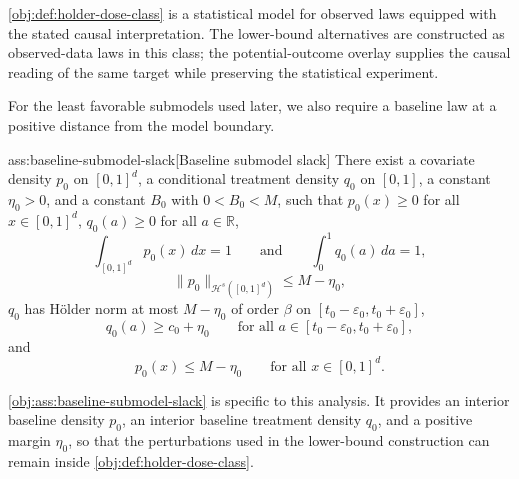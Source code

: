 \cref{obj:def:holder-dose-class} is a statistical model for observed laws equipped with the stated causal interpretation. The lower-bound alternatives are constructed as observed-data laws in this class; the potential-outcome overlay supplies the causal reading of the same target while preserving the statistical experiment.

For the least favorable submodels used later, we also require a baseline law at a positive distance from the model boundary.

\begin{assumptionv}{ass:baseline-submodel-slack}[Baseline submodel slack]
There exist a covariate density \(p_0\) on \([0,1]^d\), a conditional treatment density \(q_0\) on \([0,1]\), a constant \(\eta_0>0\), and a constant \(B_0\) with \(0<B_0<M\), such that \(p_0(x)\ge 0\) for all \(x\in[0,1]^d\), \(q_0(a)\ge 0\) for all \(a\in\mathbb R\),
\[
\int_{[0,1]^d} p_0(x)\,dx=1
\qquad\text{and}\qquad
\int_0^1 q_0(a)\,da=1,
\]
\[
\|p_0\|_{\mathcal H^s([0,1]^d)}\le M-\eta_0,
\]
\(q_0\) has Hölder norm at most \(M-\eta_0\) of order \(\beta\) on \([t_0-\varepsilon_0,t_0+\varepsilon_0]\),
\[
q_0(a)\ge c_0+\eta_0
\qquad\text{for all }a\in[t_0-\varepsilon_0,t_0+\varepsilon_0],
\]
and
\[
p_0(x)\le M-\eta_0
\qquad\text{for all }x\in[0,1]^d.
\]
\end{assumptionv}

\cref{obj:ass:baseline-submodel-slack} is specific to this analysis. It provides an interior baseline density \(p_0\), an interior baseline treatment density \(q_0\), and a positive margin \(\eta_0\), so that the perturbations used in the lower-bound construction can remain inside \cref{obj:def:holder-dose-class}.
